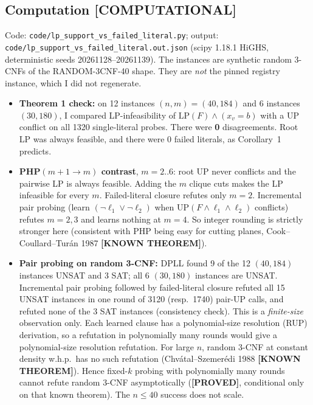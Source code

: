 \documentclass[11pt]{article}
\theoremstyle{definition}
\newcommand{\lab}[1]{\textbf{[#1]}}
\begin{document}
\subsection{Computation \lab{COMPUTATIONAL}}
Code: \texttt{code/lp\_support\_vs\_failed\_literal.py}; output:
\texttt{code/lp\_support\_vs\_failed\_literal.out.json} (scipy 1.18.1 HiGHS,
deterministic seeds 20261128--20261139). The instances are synthetic random 3-CNFs of the
RANDOM-3CNF-40 shape. They are \emph{not} the pinned registry instance, which I did not
regenerate.
\begin{itemize}
\item \textbf{Theorem 1 check:} on 12 instances $(n,m)=(40,184)$ and 6 instances
$(30,180)$, I compared LP-infeasibility of $\mathrm{LP}(F)\wedge(x_v=b)$ with a UP
conflict on all 1320 single-literal probes. There were \textbf{0} disagreements.
Root LP was always feasible, and there were 0 failed literals, as Corollary~1 predicts.
\item \textbf{PHP$(m{+}1\to m)$ contrast}, $m=2..6$: root UP never conflicts and the
pairwise LP is always feasible. Adding the $m$ clique cuts makes the LP infeasible for
every $m$. Failed-literal closure refutes only $m=2$. Incremental pair probing (learn
$(\neg\ell_1\vee\neg\ell_2)$ when UP$(F\wedge\ell_1\wedge\ell_2)$ conflicts) refutes
$m=2,3$ and learns nothing at $m=4$. So integer rounding is strictly stronger here
(consistent with PHP being easy for cutting planes, Cook--Coullard--Tur\'an 1987
\lab{KNOWN THEOREM}).
\item \textbf{Pair probing on random 3-CNF:} DPLL found 9 of the 12 $(40,184)$ instances
UNSAT and 3 SAT; all 6 $(30,180)$ instances are UNSAT. Incremental pair probing followed
by failed-literal closure refuted all 15 UNSAT instances in one round of 3120 (resp.\ 1740)
pair-UP calls, and refuted none of the 3 SAT instances (consistency check). This is a
\emph{finite-size} observation only. Each learned clause has a polynomial-size resolution
(RUP) derivation, so a refutation in polynomially many rounds would give a
polynomial-size resolution refutation. For large $n$, random 3-CNF at constant density
w.h.p.\ has no such refutation (Chv\'atal--Szemer\'edi 1988 \lab{KNOWN THEOREM}). Hence
fixed-$k$ probing with polynomially many rounds cannot refute random 3-CNF
asymptotically (\lab{PROVED}, conditional only on that known theorem). The $n\le40$ success
does not scale.
\end{itemize}
\end{document}
